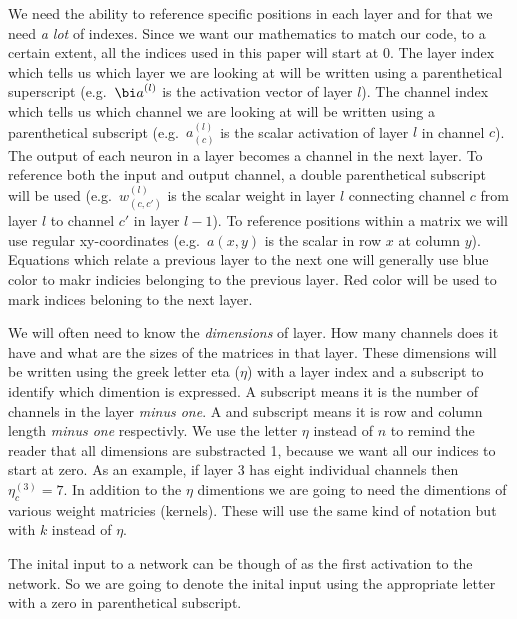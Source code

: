 We need the ability to reference specific positions in each layer and for that we need {\em a lot} of indexes.
Since we want our mathematics to match our code, to a certain extent, all the indices used in this paper will start at $0$.
The layer index which tells us which layer we are looking at will be written using a parenthetical superscript (e.g.\ ${\bi a}^{(l)}$ is the activation vector of layer $l$).
The channel index which tells us which channel we are looking at will be written using a parenthetical subscript (e.g.\ $a^{(l)}_{(c)}$ is the scalar activation of layer $l$ in channel $c$).
The output of each neuron in a layer becomes a channel in the next layer.
To reference both the input and output channel, a double parenthetical subscript will be used (e.g.\ $w^{(l)}_{(c,c')}$ is the scalar weight in layer $l$ connecting channel $c$ from layer $l$ to channel $c'$ in layer $l-1$).
To reference positions within a matrix we will use regular xy-coordinates (e.g.\ $a(x,y)$ is the scalar in row $x$ at column $y$).
Equations which relate a previous layer to the next one will generally use blue color to makr indicies belonging to the previous layer.
Red color will be used to mark indices beloning to the next layer.

We will often need to know the {\em dimensions} of layer.
How many channels does it have and what are the sizes of the matrices in that layer.
These dimensions will be written using the greek letter eta ($\eta$) with a layer index and a subscript to identify which dimention is expressed.
A  subscript means it is the number of channels in the layer {\em minus one}.
A  and  subscript means it is row and column length {\em minus one} respectivly.
We use the letter $\eta$ instead of $n$ to remind the reader that all dimensions are substracted 1, because we want all our indices to start at zero.
As an example, if layer $3$ has eight individual channels then $\eta^{(3)}_c = 7$.
In addition to the $\eta$ dimentions we are going to need the dimentions of various weight matricies (kernels).
These will use the same kind of notation but with $k$ instead of $\eta$.

The inital input to a network can be though of as the first activation to the network.
So we are going to denote the inital input using the appropriate  letter with a zero in parenthetical subscript.
\stopsubsubject


\startsubsection[title=Fully-connected layer]

\stopsubsection

